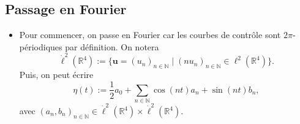 \documentclass[12pt,a4paper]{article}
\theoremstyle{plain}
\theoremstyle{plain}
\theoremstyle{plain}
\theoremstyle{definition}
\theoremstyle{definition}
\theoremstyle{definition}
\theoremstyle{plain}
\newcommand{\N}{\mathbb{N}}
\newcommand{\R}{\mathbb{R}}
\begin{document}
\subsection{Passage en Fourier}
\begin{itemize}
\item Pour commencer, on passe en Fourier car les courbes de contrôle sont $2 \pi$- périodiques par définition. On notera
\begin{equation}
\dot{\ell}^2(\R^4) := \{\mathbf{u} = (u_n)_{n \in \N} \mid (n u_n)_{n \in \N} \in \ell^2(\R^4)\}.
\end{equation}
Puis, on peut écrire
\begin{equation}
\eta(t) := \frac{1}{2} a_0 + \sum_{n \in \N} \cos(nt) a_n + \sin(n t) b_n,
\end{equation}
avec $(a_n, b_n)_{n \in \N} \in \dot{\ell}^2(\R^4) \times \dot{\ell}^2(\R^4)$.


\end{itemize}
\end{document}
